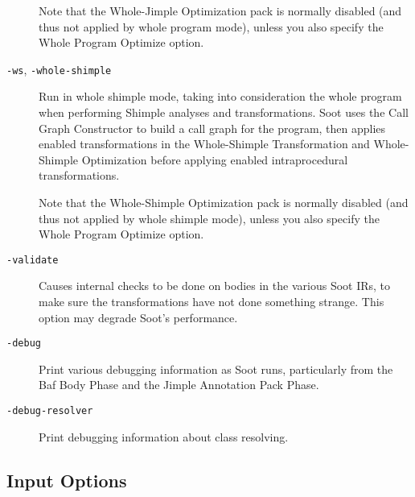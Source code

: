 \documentclass{article}
\begin{document}
\begin{description}
\par

Note that the Whole-Jimple Optimization pack is normally disabled
(and thus not applied by whole program mode), unless you also
specify the Whole Program Optimize option.



  \item[
  {\tt -ws}, 
  {\tt -whole-shimple}]


\par

Run in whole shimple mode, taking into consideration the whole program
when performing Shimple analyses and transformations. Soot uses the
Call Graph Constructor to build a call graph for the program, then
applies enabled transformations in the Whole-Shimple Transformation
and Whole-Shimple Optimization before applying enabled intraprocedural
transformations.

\par

Note that the Whole-Shimple Optimization pack is normally disabled
(and thus not applied by whole shimple mode), unless you also
specify the Whole Program Optimize option.
      


  \item[
  {\tt -validate}]

Causes internal checks to be done on bodies in the various Soot IRs,
to make sure the transformations have not done something strange.
This option may degrade Soot's performance.



  \item[
  {\tt -debug}]

Print various debugging information as Soot runs, particularly
from the Baf Body Phase and the Jimple Annotation Pack Phase.



  \item[
  {\tt -debug-resolver}]

Print debugging information about class resolving.



\end{description}


\subsection{Input Options}
\end{document}
